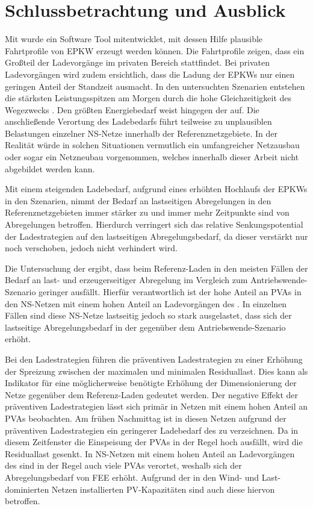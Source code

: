 \section{Schlussbetrachtung und Ausblick}\label{chap:schlussbetrachtung}

Mit  wurde ein Software Tool mitentwicklet, mit dessen Hilfe plausible Fahrtprofile von \gls{EPKW} erzeugt werden können.
Die Fahrtprofile zeigen, dass ein Großteil der Ladevorgänge im privaten Bereich stattfindet.
Bei privaten Ladevorgängen wird zudem ersichtlich, dass die Ladung der \glspl{EPKW} nur einen geringen Anteil der Standzeit ausmacht.
In den untersuchten Szenarien entstehen die stärksten Leistungsspitzen am Morgen durch die hohe Gleichzeitigkeit des Wegezwecks \Arbeitdot.
Den größten Energiebedarf weist hingegen der \UC \zH auf.
Die anschließende Verortung des Ladebedarfs führt teilweise zu unplausiblen Belastungen einzelner \gls{NS}-Netze innerhalb der Referenznetzgebiete.
In der Realität würde in solchen Situationen vermutlich ein umfangreicher Netzausbau oder sogar ein Netzneubau vorgenommen, welches innerhalb dieser Arbeit nicht abgebildet werden kann.\medskip

Mit einem steigenden Ladebedarf, aufgrund eines erhöhten Hochlaufs der \glspl{EPKW} in den Szenarien, nimmt der Bedarf an lastseitigen Abregelungen in den Referenznetzgebieten immer stärker zu und immer mehr Zeitpunkte sind von Abregelungen betroffen.
Hierdurch verringert sich das relative Senkungspotential der Ladestrategien auf den lastseitigen Abregelungsbedarf, da dieser verstärkt nur noch verschoben, jedoch nicht verhindert wird.

Die Untersuchung der \SzeFirmenparkplatz ergibt, dass beim Referenz-Laden in den meisten Fällen der Bedarf an last- und erzeugerseitiger Abregelung im Vergleich zum Antriebswende-Szenario geringer ausfällt.
Hierfür verantwortlich ist der hohe Anteil an \glspl{PVA} in den \gls{NS}-Netzen mit einem hohen Anteil an Ladevorgängen des \UC \zHdot.
In einzelnen Fällen sind diese \gls{NS}-Netze lastseitig jedoch so stark ausgelastet, dass sich der lastseitige Abregelungsbedarf in der \SzeFirmenparkplatz gegenüber dem Antriebswende-Szenario erhöht.\medskip

Bei den Ladestrategien führen die präventiven Ladestrategien zu einer Erhöhung der Spreizung zwischen der maximalen und minimalen Residuallast.
Dies kann als Indikator für eine möglicherweise benötigte Erhöhung der Dimensionierung der Netze gegenüber dem Referenz-Laden gedeutet werden.
Der negative Effekt der präventiven Ladestrategien lässt sich primär in Netzen mit einem hohen Anteil an \glspl{PVA} beobachten.
Am frühen Nachmittag ist in diesen Netzen aufgrund der präventiven Ladestrategien ein geringerer Ladebedarf des \UC \zH zu verzeichnen.
Da in diesem Zeitfenster die Einspeisung der \glspl{PVA} in der Regel hoch ausfällt, wird die Residuallast gesenkt.
In \gls{NS}-Netzen mit einem hohen Anteil an Ladevorgängen des \UC \zH sind in der Regel auch viele \glspl{PVA} verortet, weshalb sich der Abregelungsbedarf von \gls{FEE} erhöht.
Aufgrund der in den Wind- und Last-dominierten Netzen installierten \gls{PV}-Kapazitäten sind auch diese hiervon betroffen.\medskip

